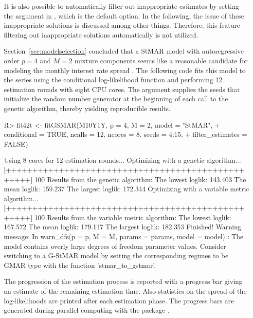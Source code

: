 \documentclass[nojss]{jss} %
\begin{document}
It is also possible to automatically filter out inappropriate estimates by setting the argument  in , which is the default option. In the following, the issue of these inappropriate solutions is discussed among other things. Therefore, this feature filtering out inappropriate solutions automatically is not utilized.

Section~\ref{sec:modelselection} concluded that a StMAR model with autoregressive order $p=4$ and $M=2$ mixture components seems like a reasonable candidate for modeling the monthly interest rate spread . The following code fits this model to the series using the conditional log-likelihood function and performing 12 estimation rounds with eight CPU cores. The argument  supplies the seeds that initialize the random number generator at the beginning of each call to the genetic algorithm, thereby yielding reproducible results.
%
\begin{CodeChunk}
\begin{CodeInput}
R> fit42t <- fitGSMAR(M10Y1Y, p = 4, M = 2, model = "StMAR",
+    conditional = TRUE, ncalls = 12, ncores = 8, seeds = 4:15,
+    filter_estimates = FALSE)
\end{CodeInput}
\begin{CodeOutput}
Using 8 cores for 12 estimation rounds...
Optimizing with a genetic algorithm...
  |++++++++++++++++++++++++++++++++++++++++++++++++++| 100%
Results from the genetic algorithm:
The lowest loglik:  143.403
The mean loglik:    159.237
The largest loglik: 172.344
Optimizing with a variable metric algorithm...
  |++++++++++++++++++++++++++++++++++++++++++++++++++| 100%
Results from the variable metric algorithm:
The lowest loglik:  167.572
The mean loglik:    179.117
The largest loglik: 182.353
Finished!
Warning message:
In warn_dfs(p = p, M = M, params = params, model = model) :
  The model contains overly large degrees of freedom parameter values.
  Consider switching to a G-StMAR model by setting the corresponding regimes
  to be GMAR type with the function 'stmar_to_gstmar'.
\end{CodeOutput}
\end{CodeChunk}
%
The progression of the estimation process is reported with a progress bar giving an estimate of the remaining estimation time. Also statistics on the spread of the log-likelihoods are printed after each estimation phase. The progress bars are generated during parallel computing with the package  \citep{Solymos+Zawadzki:2020}.
\end{document}
